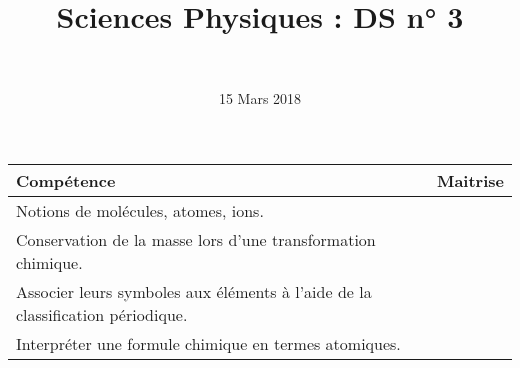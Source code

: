 \documentclass[a4paper,11pt]{exam}
\author{\ }
\date{15 Mars 2018}
\title{Sciences Physiques : DS n° 3}
\begin{document}
%	

	\maketitle
	
\begin{small}
	\begin{center}
		\begin{tabular}{|@{\ }l@{}|@{\ }c@{\ }|}
			\hline
			\textbf{Compétence} & \textbf{Maitrise} \\
			\hline
		Notions de molécules, atomes, ions. \ \ &  \ \ \ \\
			\hline
			Conservation de la masse lors d’une transformation chimique. &  \\
			\hline			
			Associer leurs symboles aux éléments à l’aide de la classification périodique. \ &  \\
			\hline
			Interpréter une formule chimique en termes atomiques. &  \\
			\hline
		\end{tabular}
	\end{center}
\end{small}	
	
	
\vspace*{-0.5cm}	

%

%












\newpage






\newpage 



\newpage 





 
%
\ \label{LastPage}
\end{document}
